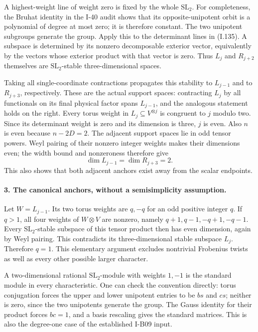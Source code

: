 A highest-weight line of weight zero is fixed by the whole
$\mathrm{SL}_2$. For completeness, the Bruhat identity in the
I-40 audit shows that its opposite-unipotent orbit is a
polynomial of degree at most zero; it is therefore constant.
The two unipotent subgroups generate the group. Apply this to
the determinant lines in (I.135). A subspace is determined by
its nonzero decomposable exterior vector, equivalently by the
vectors whose exterior product with that vector is zero.
Thus $L_j$ and $R_{j+2}$ themselves are $\mathrm{SL}_2$-stable
three-dimensional spaces.

Taking all single-coordinate contractions propagates this
stability to $L_{j-1}$ and to $R_{j+3}$, respectively. These
are the actual support spaces: contracting $L_j$ by all
functionals on its final physical factor spans $L_{j-1}$,
and the analogous statement holds on the right. Every torus
weight in $L_j\subseteq V^{\otimes j}$ is congruent to $j$
modulo two. Since its determinant weight is zero and its
dimension is three, $j$ is even. Also $n$ is even because
$n-2D=2$. The adjacent support spaces lie in odd tensor powers.
Weyl pairing of their nonzero integer weights makes their
dimensions even; the width bound and nonzeroness therefore give
\[
 \dim L_{j-1}=\dim R_{j+3}=2.
 \tag{I.136}
\]
This also shows that both adjacent anchors exist away from the
scalar endpoints.

\paragraph{3. The canonical anchors, without a semisimplicity assumption.}
Let $W=L_{j-1}$. Its two torus weights are $q,-q$ for an odd
positive integer $q$. If $q>1$, all four weights of $W\otimes V$
are nonzero, namely $q+1,q-1,-q+1,-q-1$. Every
$\mathrm{SL}_2$-stable subspace of this tensor product then has
even dimension, again by Weyl pairing. This contradicts its
three-dimensional stable subspace $L_j$. Therefore $q=1$.
This elementary argument excludes nontrivial Frobenius twists
as well as every other possible larger character.

A two-dimensional rational $\mathrm{SL}_2$-module with weights
$1,-1$ is the standard module in every characteristic. One can
check the convention directly: torus conjugation forces the
upper and lower unipotent entries to be $b s$ and $c s$;
neither is zero, since the two unipotents generate the group.
The Gauss identity for their product forces $bc=1$, and a
basis rescaling gives the standard matrices. This is also the
degree-one case of the established I-B09 input.

